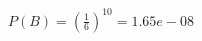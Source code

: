 \documentclass[preview]{standalone}
\begin{document}
\begin{align*}
P(B) = \left(\frac{1}{6}\right)^{10} =  1.65e-08
\end{align*}
\end{document}

